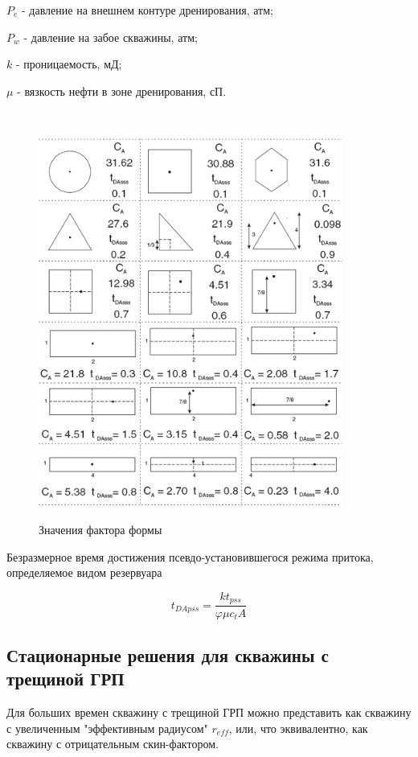 $P_e$ - давление на внешнем контуре дренирования, атм;

$P_w$ - давление на забое скважины, атм;

$k$ - проницаемость, мД;

$\mu$ - вязкость нефти в зоне дренирования, сП.

\

\begin{figure}[h!]
	\centering
	\includegraphics[width= 10cm]{pics/shape_factors.png} 
	\label{fig:shape_factors}
	\caption{Значения фактора формы}
\end{figure}


Безразмерное время достижения псевдо-установившегося режима притока, определяемое видом резервуара

$$t_{DApss} = \frac{kt_{pss}}{\varphi \mu c_t A} $$

\subsection{Стационарные решения для скважины с трещиной ГРП}

Для больших времен скважину с трещиной ГРП можно представить как скважину с увеличенным "эффективным радиусом" $r_{eff}$, или, что эквивалентно, как скважину с отрицательным скин-фактором.

